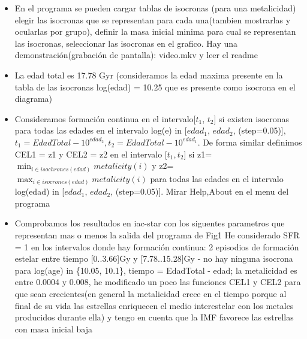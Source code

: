 \documentclass[10pt]{book}
\begin{document}
\begin{itemize}
\item En el programa se pueden cargar tablas de isocronas (para una metalicidad) elegir las isocronas que se representan para cada una(tambien mostrarlas y ocularlas por grupo), definir la masa inicial minima para cual se representan las isocronas, seleccionar las isocronas en el grafico. Hay una demonstración(grabación de pantalla): video.mkv y leer el readme
\item La edad total es 17.78 Gyr (consideramos la edad maxima presente en la tabla de las isocronas log(edad) = 10.25 que es presente como isocrona en el diagrama)
\item Consideramos formación continua en el intervalo[$t_1$, $t_2$]  si existen isocronas para todas las edades en el intervalo log(e) in [$edad_1$, $edad_2$,  (step=0.05)], $t_1=EdadTotal - 10^{edad_2}, t_2=EdadTotal - 10^{edad_1}$. De forma similar definimos CEL1 = z1 y CEL2 = z2 en el intervalo [$t_1, t_2$] si z1=$\displaystyle \min_{i \in isochrones(edad)} metalicity(i)$ y z2=$\displaystyle \max_{i \in isocrones(edad)} metalicity(i)$ para todas las edades  en el intervalo log(edad) in [$edad_1$, $edad_2$,  (step=0.05)]. Mirar Help,About en el menu del programa
\item Comprobamos los resultados en iac-star con los siguentes parametros que representan mas o menos la salida del programa de Fig1
He considerado SFR = 1 en los intervalos donde hay formación continua: 2 episodios de formación estelar entre tiempo [0..3.66]Gy y [7.78..15.28]Gy - no hay ninguna isocrona para log(age) in \{10.05, 10.1\}, tiempo = EdadTotal - edad; la metalicidad es entre 0.0004 y 0.008, he modificado un poco las funciones  CEL1 y CEL2 para que sean crecientes(en general la metalicidad crece en el tiempo porque al final de su vida las estrellas enriquecen el medio interestelar con los metales producidos durante ella) y tengo en cuenta que la IMF favorece las estrellas con masa inicial baja




\end{itemize}
\end{document}
